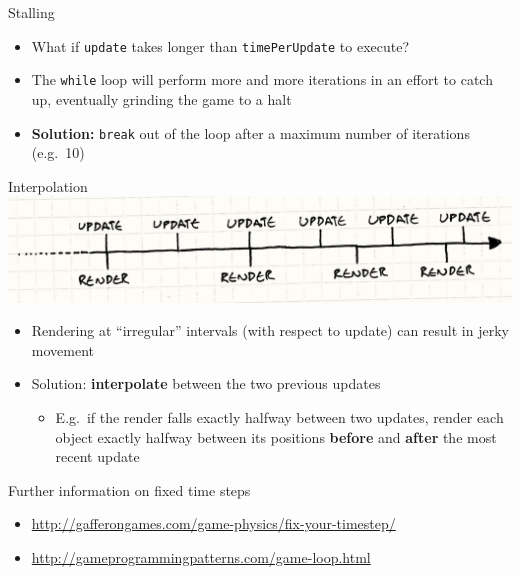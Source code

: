 \begin{frame}{Stalling}
    \begin{itemize}
        \item What if \lstinline{update} takes longer than \lstinline{timePerUpdate} to execute?
        \item The \lstinline{while} loop will perform more and more iterations in an effort
            to catch up, eventually grinding the game to a halt
        \item \textbf{Solution:} \lstinline{break} out of the loop after a maximum number of iterations
            (e.g.\ 10)
    \end{itemize}
\end{frame}

\begin{frame}{Interpolation}
    \includegraphics[width=\textwidth]{game-loop-timeline}
    \begin{itemize}
        \item Rendering at ``irregular'' intervals (with respect to update) can result in
            jerky movement
        \item Solution: \textbf{interpolate} between the two previous updates
            \begin{itemize}
                \item E.g.\ if the render falls exactly halfway between two updates,
                    render each object exactly halfway between its positions
                    \textbf{before} and \textbf{after} the most recent update
            \end{itemize}
    \end{itemize}
\end{frame}

\begin{frame}{Further information on fixed time steps}
    \begin{itemize}
        \item \url{http://gafferongames.com/game-physics/fix-your-timestep/}
        \item \url{http://gameprogrammingpatterns.com/game-loop.html}
    \end{itemize}
\end{frame}

